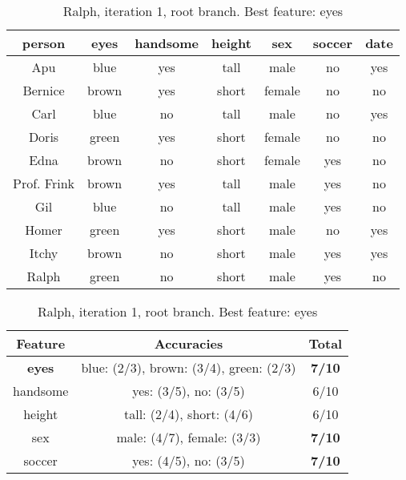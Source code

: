 \begin{table}[h!]
  \centering
  \begin{tabular}{cccccc|c}
    \toprule
    person      & eyes  & handsome & height & sex    & soccer & date\\
    \midrule
    Apu         & blue  & yes      & tall   & male   & no     & yes \\
    Bernice     & brown & yes      & short  & female & no     & no  \\
    Carl        & blue  & no       & tall   & male   & no     & yes \\
    Doris       & green & yes      & short  & female & no     & no  \\
    Edna        & brown & no       & short  & female & yes    & no  \\
    Prof. Frink & brown & yes      & tall   & male   & yes    & no  \\
    Gil         & blue  & no       & tall   & male   & yes    & no  \\
    Homer       & green & yes      & short  & male   & no     & yes \\
    Itchy       & brown & no       & short  & male   & yes    & yes \\
    Ralph       & green & no       & short  & male   & yes    & no  \\
    \bottomrule
  \end{tabular}

  \vspace{.5cm}

  \begin{tabular}{ccc}
    \toprule
    Feature         & Accuracies                              & Total\\
    \midrule
    \textbf{eyes}   & blue: (2/3), brown: (3/4), green: (2/3) & \textbf{7/10}\\
    handsome        & yes: (3/5), no: (3/5)                   & 6/10\\
    height          & tall: (2/4), short: (4/6)               & 6/10\\
    sex             & male: (4/7), female: (3/3)              & \textbf{7/10}\\
    soccer          & yes: (4/5), no: (3/5)                   & \textbf{7/10}\\
    \bottomrule
  \end{tabular}
  \caption*{Ralph, iteration 1, root branch. Best feature: eyes}
\end{table}

